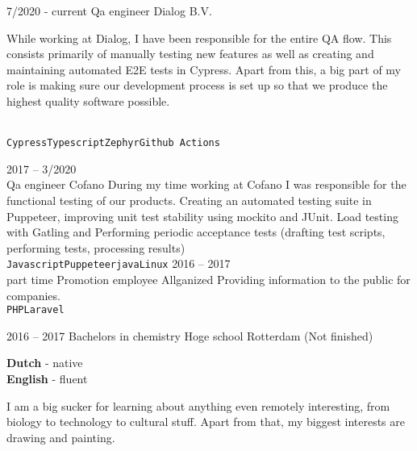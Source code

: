 \documentclass[9pt]{developercv} %
\begin{document}
    \begin{entrylist}
        \entry
        {7/2020 - current}
        {Qa engineer}
        {Dialog B.V.}
        {While working at Dialog, I have been responsible for the entire QA flow. This consists primarily of manually testing new features as well as creating and maintaining automated E2E tests in Cypress.
        Apart from this, a big part of my role is making sure our development process is set up so that we produce the highest quality software possible.

        \\ \texttt{Cypress}\slashsep\texttt{Typescript}\slashsep\texttt{Zephyr}\slashsep\texttt{Github Actions}}
        \entry
        {2017 -- 3/2020\\}
        {Qa engineer}
        {Cofano}
        {During my time working at Cofano I was responsible for the functional testing of our products.
        Creating an automated testing suite in Puppeteer,
            improving unit test stability using mockito and JUnit.
            Load testing with Gatling and
            Performing periodic acceptance tests (drafting test scripts, performing tests, processing results)\\
        \texttt{Javascript}\slashsep\texttt{Puppeteer}\slashsep\texttt{java}\slashsep\texttt{Linux}}
        \entry
        {2016 -- 2017\\\footnotesize{part time}}
        {Promotion employee}
        {Allganized}
        {Providing information to the public for companies.\\ \texttt{PHP}\slashsep\texttt{Laravel}}
    \end{entrylist}


        \entry
        {2016 -- 2017}
        {Bachelors in chemistry}
        {Hoge school Rotterdam}
        {(Not finished)}

    \begin{minipage}[t]{0.3\textwidth}
        \vspace{-\baselineskip} %


        \textbf{Dutch} - native\\
        \textbf{English} - fluent
    \end{minipage}
    \hfill
    \begin{minipage}[t]{0.5\textwidth}
        \vspace{-\baselineskip} %


        {I am a big sucker for learning about anything even remotely interesting, from biology to technology to cultural stuff. Apart from that, my biggest interests are drawing and painting.}
    \end{minipage}
    \hfill

\end{document}
